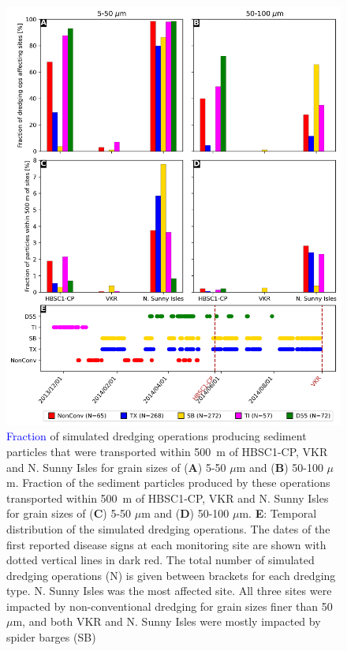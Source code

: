 \documentclass[preprint,12pt,authoryear]{elsarticle}
\newcommand{\modif}[1]{\textcolor{blue}{#1}}
\begin{document}
\begin{figure}
	\centering
	\includegraphics[width=.85\textwidth]{figures/aggregated_stokes4_v3_500m_timeline_rel.png}
	\caption{\modif{Fraction} of simulated dredging operations producing sediment particles that were transported within 500~m of HBSC1-CP, VKR and N. Sunny Isles for grain sizes of (\textbf{A}) 5-50 $\mu$m  and (\textbf{B}) 50-100 $\mu$m. Fraction of the sediment particles produced by these operations transported within 500~m of HBSC1-CP, VKR and N. Sunny Isles for grain sizes of (\textbf{C}) 5-50 $\mu$m  and (\textbf{D}) 50-100 $\mu$m. \textbf{E}: Temporal distribution of the simulated dredging operations. The dates of the first reported disease signs at each monitoring site are shown with dotted vertical lines in dark red. The total number of simulated dredging operations (N) is given between brackets for each dredging type. N. Sunny Isles was the most affected site. All three sites were impacted by non-conventional dredging for grain sizes finer than 50~$\mu$m, and both VKR and N. Sunny Isles were mostly impacted by spider barges (SB)}\label{fig:onset_bar}
\end{figure}
\end{document}
